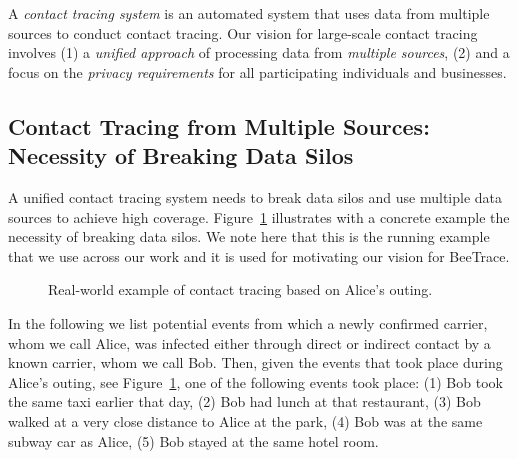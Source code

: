 \documentclass[11pt]{article}  %
\newcommand{\sysname}{\textsf{BeeTrace}\xspace}
\begin{document}
A \emph{contact tracing system} is an automated system that uses data from multiple sources to conduct contact tracing. Our vision for large-scale contact tracing involves (1) a \emph{unified approach} of processing data from \emph{multiple sources}, (2) and a focus on the  \emph{privacy requirements} for all participating individuals and businesses.

\subsection{Contact Tracing from Multiple Sources: Necessity of Breaking Data Silos}
\label{bds}

A unified contact tracing system needs to break data silos and use multiple data sources to achieve high coverage. Figure~\ref{fig:example} illustrates with a concrete example the necessity of breaking data silos. We note here that this is the running example that we use across our work and it is used for motivating our vision for \sysname.

\begin{figure}[t!]
	\centering
	\caption{Real-world example of contact tracing based on Alice's outing.}
	\label{fig:example}	
\end{figure}

In the following we list potential events from which a newly confirmed carrier, whom we call Alice, was infected either through direct or indirect contact by a known carrier, whom we call Bob.
Then, given the events that took place during Alice's outing, see Figure~\ref{fig:example}, one of the following events took place: (1) Bob took the same taxi earlier that day, (2) Bob had lunch at that restaurant, (3) Bob walked at a very close distance to Alice at the park, (4) Bob was at the same subway car as Alice, (5) Bob stayed at the same hotel room.
\end{document}
